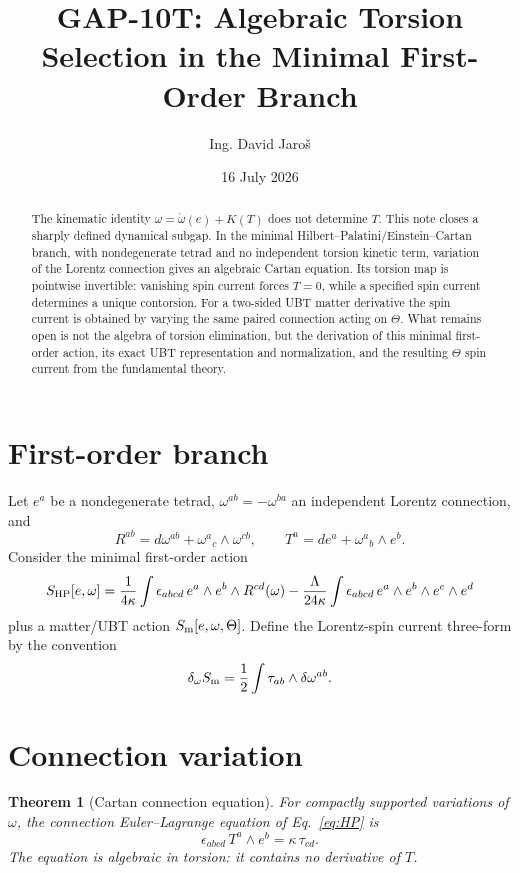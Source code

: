 \documentclass[12pt,a4paper]{article}
\title{GAP-10T: Algebraic Torsion Selection in the Minimal First-Order Branch}
\author{Ing. David Jaro\v{s}}
\date{16 July 2026}
\newtheorem{theorem}[definition]{Theorem}
\theoremstyle{remark}\newtheorem{remark}[definition]{Remark}
\begin{document}
\maketitle

\begin{abstract}
The kinematic identity $\omega=\mathring\omega(e)+K(T)$ does not determine
$T$.  This note closes a sharply defined dynamical subgap.  In the minimal
Hilbert--Palatini/Einstein--Cartan branch, with nondegenerate tetrad and no
independent torsion kinetic term, variation of the Lorentz connection gives an
algebraic Cartan equation.  Its torsion map is pointwise invertible: vanishing
spin current forces $T=0$, while a specified spin current determines a unique
contorsion.  For a two-sided UBT matter derivative the spin current is obtained
by varying the same paired connection acting on $\Theta$.  What remains open is
not the algebra of torsion elimination, but the derivation of this minimal
first-order action, its exact UBT representation and normalization, and the
resulting $\Theta$ spin current from the fundamental theory.
\end{abstract}

\section{First-order branch}
Let $e^a$ be a nondegenerate tetrad, $\omega^{ab}=-\omega^{ba}$ an independent
Lorentz connection, and
\[
 R^{ab}=d\omega^{ab}+\omega^a{}_c\wedge\omega^{cb},\qquad
 T^a=de^a+\omega^a{}_b\wedge e^b.
\]
Consider the minimal first-order action
\begin{equation}
 S_{\rm HP}[e,\omega]
 =\frac{1}{4\kappa}\int
 \epsilon_{abcd}\,e^a\wedge e^b\wedge R^{cd}(\omega)
 -\frac{\Lambda}{24\kappa}\int
 \epsilon_{abcd}\,e^a\wedge e^b\wedge e^c\wedge e^d
 \label{eq:HP}
\end{equation}
plus a matter/UBT action $S_{\rm m}[e,\omega,\Theta]$.  Define the Lorentz-spin
current three-form by the convention
\begin{equation}
 \delta_\omega S_{\rm m}
 =\frac12\int \tau_{ab}\wedge\delta\omega^{ab}.
 \label{eq:spin-current-def}
\end{equation}

\section{Connection variation}
\begin{theorem}[Cartan connection equation]
For compactly supported variations of $\omega$, the connection Euler--Lagrange
equation of Eq.~\eqref{eq:HP} is
\begin{equation}
 \boxed{\epsilon_{abcd}\,T^a\wedge e^b=\kappa\,\tau_{cd}.}
 \label{eq:cartan}
\end{equation}
The equation is algebraic in torsion: it contains no derivative of $T$.
\end{theorem}
\end{document}
